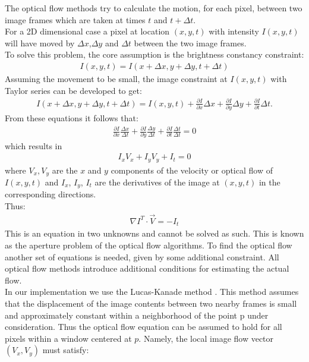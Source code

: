The optical flow methods \cite{beauchemin1995computation} try to calculate the motion, for each pixel, between two image frames which are taken at times $t$ and $t+\Delta t$. \\
For a 2D dimensional case a pixel at location $(x,y,t)$ with intensity $I(x,y,t)$ will have moved by $\Delta x$,$\Delta y$ and $\Delta t$ between the two image frames. \\
To solve this problem, the core assumption is the brightness constancy constraint:
\begin{align}
I(x,y,t) = I(x+\Delta x, y + \Delta y, t + \Delta t)
\end{align}
Assuming the movement to be small, the image constraint at $I(x,y,t)$ with Taylor series can be developed to get:
\begin{align}
I(x+\Delta x,y+\Delta y,t+\Delta t) = I(x,y,t) + \frac{\partial I}{\partial x}\Delta x+\frac{\partial I}{\partial y}\Delta y+\frac{\partial I}{\partial t}\Delta t.
\end{align}
From these equations it follows that:
\begin{align}
 \frac{\partial I}{\partial x}\frac{\Delta x}{\Delta t}+\frac{\partial I}{\partial y}\frac{\Delta y}{\Delta t}+\frac{\partial I}{\partial t}\frac{\Delta t}{\Delta t} = 0
\end{align}
which results in
\begin{align}
 I_{x}V_x+I_{y}V_y+I_{t}= 0
\end{align}
where $V_x,V_y$ are the $x$ and $y$ components of the velocity or optical flow of $I(x,y,t)$ and $I_{x}$, $I_{y}$, $I_{t}$ are the derivatives of the image at $(x,y,t)$ in the corresponding directions.\\
Thus:
\begin{align}
 \nabla I^T\cdot\vec{V} = -I_t
\end{align}
This is an equation in two unknowns and cannot be solved as such. This is known as the aperture problem of the optical flow algorithms. To find the optical flow another set of equations is needed, given by some additional constraint. All optical flow methods introduce additional conditions for estimating the actual flow.\\
In our implementation we use the Lucas-Kanade method \cite{lucas1981iterative}.
This method assumes that the displacement of the image contents between two nearby frames is small and approximately constant within a neighborhood of the point p under consideration. Thus the optical flow equation can be assumed to hold for all pixels within a window centered at $p$. Namely, the local image flow vector $(V_{x},V_{y})$ must satisfy:


